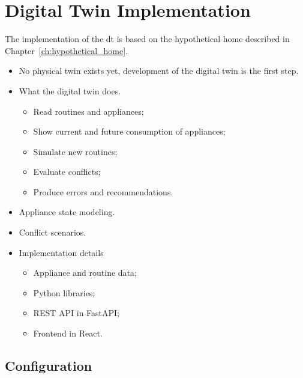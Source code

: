 \chapter{Digital Twin Implementation}\label{ch:implementation}

The implementation of the \acrshort{dt} is based on the hypothetical home described in Chapter~\ref{ch:hypothetical_home}.

\begin{itemize}
    \item No physical twin exists yet, development of the digital twin is the first step.
    \item What the digital twin does.
          \begin{itemize}
              \item Read routines and appliances;
              \item Show current and future consumption of appliances;
              \item Simulate new routines;
              \item Evaluate conflicts;
              \item Produce errors and recommendations.
          \end{itemize}
    \item Appliance state modeling.
    \item Conflict scenarios.
    \item Implementation details
          \begin{itemize}
              \item Appliance and routine data;
              \item Python libraries;
              \item REST API in FastAPI;
              \item Frontend in React.
          \end{itemize}
\end{itemize}

\section{Configuration}



